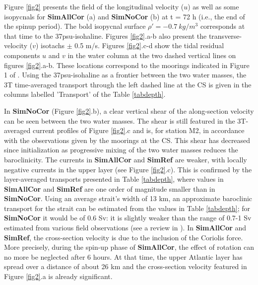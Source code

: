 Figure \ref{fig2} presents the field of the longitudinal velocity ($u$) as well as some isopycnals for \textbf{SimAllCor} (a) and \textbf{SimNoCor} (b) at t = 72 h (i.e., the end of the spinup period). The bold isopycnal surface $\rho'= -0.7\ kg/m^3$ corresponds at that time to the 37psu-isohaline. Figures \ref{fig2}.a-b  also present the transverse-velocity ($v$) isotachs $\pm$ 0.5 m/s. Figures \ref{fig2}.c-d show the tidal residual components $u$ and $v$ in the water column at the two dashed vertical lines on figures \ref{fig2}.a-b. These locations correspond to the moorings indicated in Figure 1 of \citet{CW90}. Using the 37psu-isohaline as a frontier between the two water masses, the 3T time-averaged transport through the left dashed line at the CS is given in the columns labelled 'Transport' of the Table \ref{tabdepth}.

In \textbf{SimNoCor} (Figure \ref{fig2}.b), a clear vertical shear of the along-section velocity can be seen between the two water masses. The shear is still featured in the 3T-averaged current profiles of Figure \ref{fig2}.c and is, for station M2, in accordance with the observations given by the moorings at the CS. This shear has decreased since initialization as progressive mixing of the two water masses reduces the baroclinicity. The currents in \textbf{SimAllCor} and \textbf{SimRef} are weaker, with locally negative currents in the upper layer (see Figure \ref{fig2}.c). This is confirmed by the layer-averaged transports presented in Table \ref{tabdepth}, where values in \textbf{SimAllCor} and \textbf{SimRef} are one order of magnitude smaller than in \textbf{SimNoCor}. Using an average strait's width of 13 km, an approximate baroclinic transport for the strait can be estimated from the values in Table \ref{tabdepth}; for \textbf{SimNoCor} it would be of 0.6 Sv: it is slightly weaker than the range of 0.7-1 Sv estimated from various field observations (see a review in \citet{Sammartino2015}). In \textbf{SimAllCor} and \textbf{SimRef}, the cross-section velocity is due to the inclusion of the Coriolis force. More precisely, during the spin-up phase of \textbf{SimAllCor}, the effect of rotation can no more be neglected after 6 hours. At that time, the upper Atlantic layer has spread over a distance of about 26 km and the cross-section velocity featured in Figure \ref{fig2}.a is already significant.

